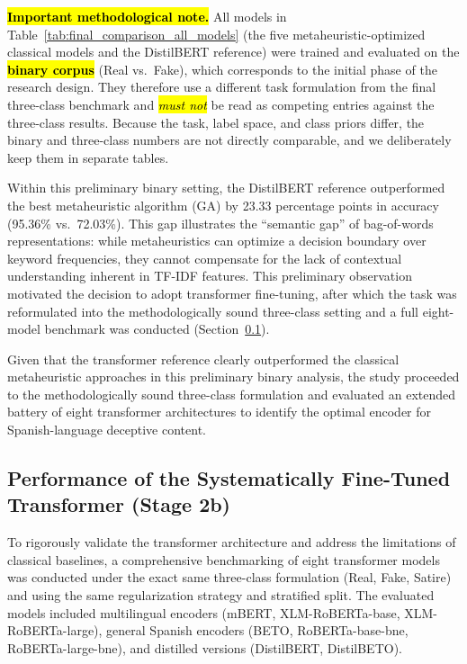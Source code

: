 \documentclass[informatics,article,accept,pdftex,moreauthors]{Definitions/mdpi}
\begin{document}
\textbf{\hl{Important methodological note.}} All models in Table~\ref{tab:final_comparison_all_models} (the five metaheuristic-optimized classical models and the DistilBERT reference) were trained and evaluated on the \textbf{\hl{binary corpus}} (Real vs.\ Fake), which corresponds to the initial phase of the research design. They therefore use a different task formulation from the final three-class benchmark and \emph{\hl{must not}} be read as competing entries against the three-class results. Because the task, label space, and class priors differ, the binary and three-class numbers are not directly comparable, and we deliberately keep them in separate tables.

Within this preliminary binary setting, the DistilBERT reference outperformed the best metaheuristic algorithm (GA) by 23.33 percentage points in accuracy (95.36\% vs.\ 72.03\%). This gap illustrates the ``semantic gap'' of bag-of-words representations: while metaheuristics can optimize a decision boundary over keyword frequencies, they cannot compensate for the lack of contextual understanding inherent in TF-IDF features. This preliminary observation motivated the decision to adopt transformer fine-tuning, after which the task was reformulated into the methodologically sound three-class setting and a full eight-model benchmark was conducted (Section~\ref{sec:transformer-results}).



Given that the transformer reference clearly outperformed the classical metaheuristic approaches in this preliminary binary analysis, the study proceeded to the methodologically sound three-class formulation and evaluated an extended battery of eight transformer architectures to identify the optimal encoder for Spanish-language deceptive content.

\subsection{Performance of the Systematically Fine-Tuned Transformer (Stage 2b)}\label{sec:transformer-results}
To rigorously validate the transformer architecture and address the limitations of classical baselines, a comprehensive benchmarking of eight transformer models was conducted under the exact same three-class formulation (Real, Fake, Satire) and using the same regularization strategy and stratified split. The evaluated models included multilingual encoders (mBERT, XLM-RoBERTa-base, XLM-RoBERTa-large), general Spanish encoders (BETO, RoBERTa-base-bne, RoBERTa-large-bne), and distilled versions (DistilBERT, DistilBETO).
\end{document}
